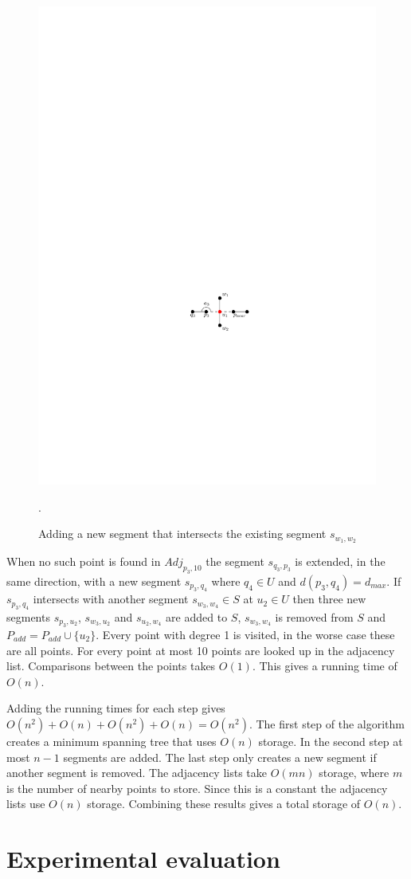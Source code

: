 \documentclass[11pt]{article}
\begin{document}
\begin{figure}[h]
\centering
      \graphicspath{ {images/}}
      \includegraphics[width=0.5\linewidth]{NetworkAddIntersection}
      \caption{Adding a new segment that intersects the existing segment $s_{w_1,w_2}$}.
      \label{addintersect}
  \end{figure}

When no such point is found in $Adj_{p_3,10}$ the segment $s_{q_3, p_3}$ is extended, in the same direction, with a new segment $s_{p_3,q_4}$ where $q_4 \in U$ and $d(p_3,q_4)=d_{max}$. If $s_{p_3,q_4}$ intersects with another segment $s_{w_3,w_4} \in S$ at $u_2 \in U$ then three new segments $s_{p_3,u_2}$, $s_{w_3,u_2}$ and $s_{u_2,w_4}$ are added to $S$, $s_{w_3,w_4}$ is removed from $S$ and $P_{add}=P_{add}\cup \{u_2\}$. Every point with degree 1 is visited, in the worse case these are all points. For every point at most 10 points are looked up in the adjacency list. Comparisons between the points takes $O(1)$. This gives a running time of $O(n)$.

Adding the running times for each step gives $O(n^2)+O(n)+O(n^2)+O(n)=O(n^2)$. The first step of the algorithm creates a minimum spanning tree that uses $O(n)$ storage. In the second step at most $n-1$ segments are added. The last step only creates a new segment if another segment is removed. The adjacency lists take $O(mn)$ storage, where $m$ is the number of nearby points to store. Since this is a constant the adjacency lists use $O(n)$ storage. Combining these results gives a total storage of $O(n)$.


\section{Experimental evaluation}
\end{document}

